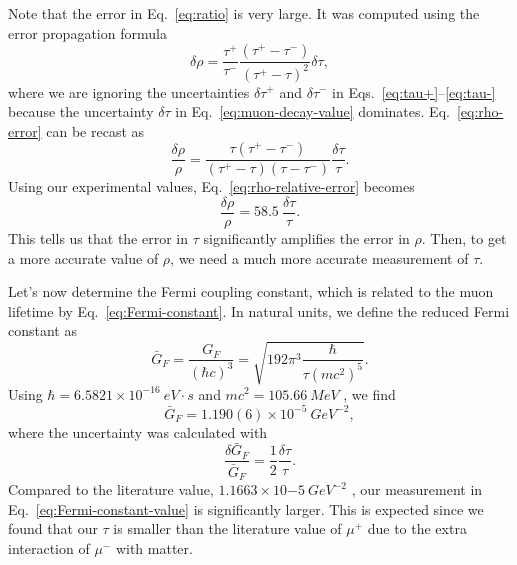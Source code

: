 \documentclass{../paper}
\begin{document}
Note that the error in Eq.~\eqref{eq:ratio} is very large. It was computed using the error propagation formula
\begin{equation}\label{eq:rho-error}
  \delta\rho = \frac{\tau^+}{\tau^-} \frac{(\tau^+ - \tau^-)}{(\tau^+ - \tau)^2} \delta\tau,
\end{equation}
where we are ignoring the uncertainties $\delta\tau^+$ and $\delta\tau^-$ in Eqs.~\eqref{eq:tau+}--\eqref{eq:tau-} because the uncertainty $\delta\tau$ in Eq.~\eqref{eq:muon-decay-value} dominates. Eq.~\eqref{eq:rho-error} can be recast as
\begin{equation}\label{eq:rho-relative-error}
  \frac{\delta\rho}{\rho} = \frac{\tau (\tau^+ - \tau^-)}{(\tau^+ - \tau) (\tau - \tau^-)} \frac{\delta\tau}{\tau}.
\end{equation}
Using our experimental values, Eq.~\eqref{eq:rho-relative-error} becomes
\begin{equation}\label{eq:rho-relative-error-numeric}
  \frac{\delta\rho}{\rho} = 58.5\ \frac{\delta\tau}{\tau}.
\end{equation}
This tells us that the error in $\tau$ significantly amplifies the error in $\rho$. Then, to get a more accurate value of $\rho$, we need a much more accurate measurement of $\tau$.

Let's now determine the Fermi coupling constant, which is related to the muon lifetime by Eq.~\eqref{eq:Fermi-constant}. In natural units, we define the reduced Fermi constant as
\begin{equation}
  \bar G_F = \frac{G_F}{(\hbar c)^3} = \sqrt{ 192 \pi^3 \frac{\hbar}{\tau (m c^2)^5} }.
\end{equation}
Using $\hbar = 6.5821 \times 10^{-16} \ eV \cdot s$ \cite{NIST_hbar} and $m c^2 = 105.66 \ MeV$ \cite{NIST_muon}, we find
\begin{equation}\label{eq:Fermi-constant-value}
  \bar G_F = 1.190(6) \times 10^{-5} \ GeV^{-2},
\end{equation}
where the uncertainty was calculated with
\begin{equation}
  \frac{\delta \bar G_F}{\bar G_F} = \frac{1}{2} \frac{\delta \tau}{\tau}.
\end{equation}
Compared to the literature value, $1.1663 \times 10{-5} \ GeV^{-2}$ \cite{NIST_Fermi}, our measurement in Eq.~\eqref{eq:Fermi-constant-value} is significantly larger. This is expected since we found that our $\tau$ is smaller than the literature value of $\mu^+$ due to the extra interaction of $\mu^-$ with matter.
\end{document}
